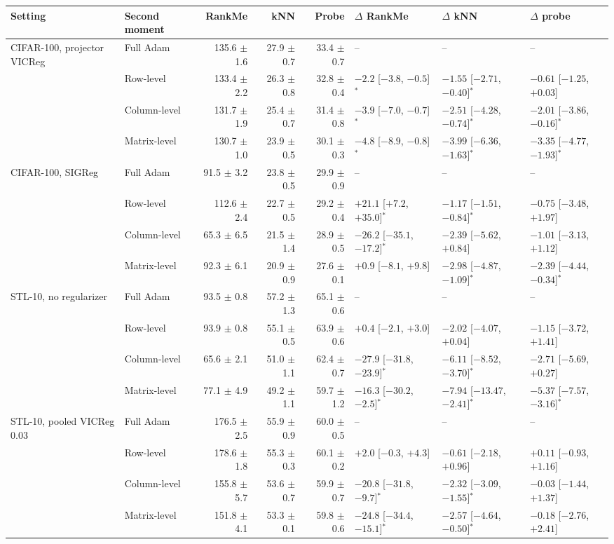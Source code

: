 \begin{tabular}{llrrrlll}
\toprule
Setting & Second moment & RankMe & kNN & Probe & $\Delta$ RankMe & $\Delta$ kNN & $\Delta$ probe \\
\midrule
CIFAR-100, projector VICReg & Full Adam & 135.6 $\pm$ 1.6 & 27.9 $\pm$ 0.7 & 33.4 $\pm$ 0.7 & -- & -- & -- \\
 & Row-level & 133.4 $\pm$ 2.2 & 26.3 $\pm$ 0.8 & 32.8 $\pm$ 0.4 & $-2.2$ [$-3.8$, $-0.5$]$^{*}$ & $-1.55$ [$-2.71$, $-0.40$]$^{*}$ & $-0.61$ [$-1.25$, $+0.03$] \\
 & Column-level & 131.7 $\pm$ 1.9 & 25.4 $\pm$ 0.7 & 31.4 $\pm$ 0.8 & $-3.9$ [$-7.0$, $-0.7$]$^{*}$ & $-2.51$ [$-4.28$, $-0.74$]$^{*}$ & $-2.01$ [$-3.86$, $-0.16$]$^{*}$ \\
 & Matrix-level & 130.7 $\pm$ 1.0 & 23.9 $\pm$ 0.5 & 30.1 $\pm$ 0.3 & $-4.8$ [$-8.9$, $-0.8$]$^{*}$ & $-3.99$ [$-6.36$, $-1.63$]$^{*}$ & $-3.35$ [$-4.77$, $-1.93$]$^{*}$ \\
\midrule
CIFAR-100, SIGReg & Full Adam & 91.5 $\pm$ 3.2 & 23.8 $\pm$ 0.5 & 29.9 $\pm$ 0.9 & -- & -- & -- \\
 & Row-level & 112.6 $\pm$ 2.4 & 22.7 $\pm$ 0.5 & 29.2 $\pm$ 0.4 & $+21.1$ [$+7.2$, $+35.0$]$^{*}$ & $-1.17$ [$-1.51$, $-0.84$]$^{*}$ & $-0.75$ [$-3.48$, $+1.97$] \\
 & Column-level & 65.3 $\pm$ 6.5 & 21.5 $\pm$ 1.4 & 28.9 $\pm$ 0.5 & $-26.2$ [$-35.1$, $-17.2$]$^{*}$ & $-2.39$ [$-5.62$, $+0.84$] & $-1.01$ [$-3.13$, $+1.12$] \\
 & Matrix-level & 92.3 $\pm$ 6.1 & 20.9 $\pm$ 0.9 & 27.6 $\pm$ 0.1 & $+0.9$ [$-8.1$, $+9.8$] & $-2.98$ [$-4.87$, $-1.09$]$^{*}$ & $-2.39$ [$-4.44$, $-0.34$]$^{*}$ \\
\midrule
STL-10, no regularizer & Full Adam & 93.5 $\pm$ 0.8 & 57.2 $\pm$ 1.3 & 65.1 $\pm$ 0.6 & -- & -- & -- \\
 & Row-level & 93.9 $\pm$ 0.8 & 55.1 $\pm$ 0.5 & 63.9 $\pm$ 0.6 & $+0.4$ [$-2.1$, $+3.0$] & $-2.02$ [$-4.07$, $+0.04$] & $-1.15$ [$-3.72$, $+1.41$] \\
 & Column-level & 65.6 $\pm$ 2.1 & 51.0 $\pm$ 1.1 & 62.4 $\pm$ 0.7 & $-27.9$ [$-31.8$, $-23.9$]$^{*}$ & $-6.11$ [$-8.52$, $-3.70$]$^{*}$ & $-2.71$ [$-5.69$, $+0.27$] \\
 & Matrix-level & 77.1 $\pm$ 4.9 & 49.2 $\pm$ 1.1 & 59.7 $\pm$ 1.2 & $-16.3$ [$-30.2$, $-2.5$]$^{*}$ & $-7.94$ [$-13.47$, $-2.41$]$^{*}$ & $-5.37$ [$-7.57$, $-3.16$]$^{*}$ \\
\midrule
STL-10, pooled VICReg 0.03 & Full Adam & 176.5 $\pm$ 2.5 & 55.9 $\pm$ 0.9 & 60.0 $\pm$ 0.5 & -- & -- & -- \\
 & Row-level & 178.6 $\pm$ 1.8 & 55.3 $\pm$ 0.3 & 60.1 $\pm$ 0.2 & $+2.0$ [$-0.3$, $+4.3$] & $-0.61$ [$-2.18$, $+0.96$] & $+0.11$ [$-0.93$, $+1.16$] \\
 & Column-level & 155.8 $\pm$ 5.7 & 53.6 $\pm$ 0.7 & 59.9 $\pm$ 0.7 & $-20.8$ [$-31.8$, $-9.7$]$^{*}$ & $-2.32$ [$-3.09$, $-1.55$]$^{*}$ & $-0.03$ [$-1.44$, $+1.37$] \\
 & Matrix-level & 151.8 $\pm$ 4.1 & 53.3 $\pm$ 0.1 & 59.8 $\pm$ 0.6 & $-24.8$ [$-34.4$, $-15.1$]$^{*}$ & $-2.57$ [$-4.64$, $-0.50$]$^{*}$ & $-0.18$ [$-2.76$, $+2.41$] \\
\bottomrule
\end{tabular}
